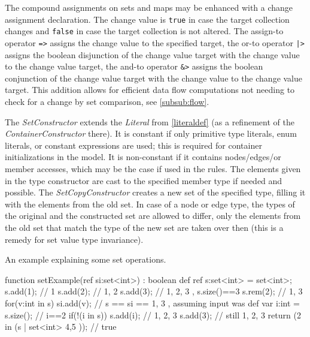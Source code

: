 The compound assignments on sets and maps may be enhanced with a change assignment declaration.
The change value is \texttt{true} in case the target collection changes and \texttt{false} in case the target collection is not altered.
The assign-to operator \verb#=># assigns the change value to the specified target, the or-to operator \verb#|># assigns the boolean disjunction of the change value target with the change value to the change value target, the and-to operator \verb#&># assigns the boolean conjunction of the change value target with the change value to the change value target.
This addition allows for efficient data flow computations not needing to check for a change by set comparison, see \ref{subsub:flow}.

The \emph{SetConstructor} extends the \emph{Literal} from \ref{literaldef} (as a refinement of the \emph{ContainerConstructor} there).
It is constant if only primitive type literals, enum literals, or constant expressions are used; this is required for container initializations in the model.
It is non-constant if it contains nodes/edges/or member accesses, which may be the case if used in the rules.
The elements given in the type constructor are cast to the specified member type if needed and possible.
The \emph{SetCopyConstructor} creates a new set of the specified type, filling it with the elements from the old set. 
In case of a node or edge type, the types of the original and the constructed set are allowed to differ, 
only the elements from the old set that match the type of the new set are taken over then (this is a remedy for set value type invariance).


\begin{example}
An example explaining some set operations.
\begin{grgen}
function setExample(ref si:set<int>) : boolean
{
	def ref s:set<int> = set<int>{};
	s.add(1); // { 1 }
	s.add(2); // { 1, 2 }
	s.add(3); // { 1, 2, 3 }, s.size()==3
	s.rem(2); // { 1, 3 }
	for(v:int in s) {
		si.add(v);
	} // s == si == { 1, 3 }, assuming input was {}
	def var i:int = s.size(); // i==2
	if(!(i in s)) { 
		s.add(i);
	} // { 1, 2, 3 }
	s.add(3); // still { 1, 2, 3 }
	return (2 in (s | set<int>{ 4,5 })); // true
}
\end{grgen}
\end{example}


